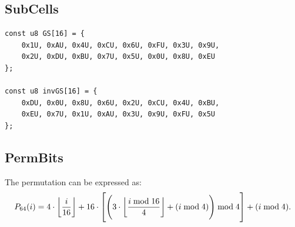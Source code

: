 \subsection{SubCells}

\begin{table}[h]
	\caption{Specifications of $\gift$ Sbox $GS$}
	\label{table:gift-sbox}
\end{table}
\begin{lstlisting}[style=C]
const u8 GS[16] = {
	0x1U, 0xAU, 0x4U, 0xCU, 0x6U, 0xFU, 0x3U, 0x9U,
	0x2U, 0xDU, 0xBU, 0x7U, 0x5U, 0x0U, 0x8U, 0xEU
};

const u8 invGS[16] = {
	0xDU, 0x0U, 0x8U, 0x6U, 0x2U, 0xCU, 0x4U, 0xBU,
	0xEU, 0x7U, 0x1U, 0xAU, 0x3U, 0x9U, 0xFU, 0x5U
};
\end{lstlisting}


\subsection{PermBits}
The permutation can be expressed as: \[
P_{64}(i)=4\cdot\floor*{\frac{i}{16}}+16\cdot\left[\left(3\cdot\floor*{\frac{i\bmod 16}{4}}+(i\bmod 4)\right)\bmod 4\right] + (i\bmod 4).
\]

